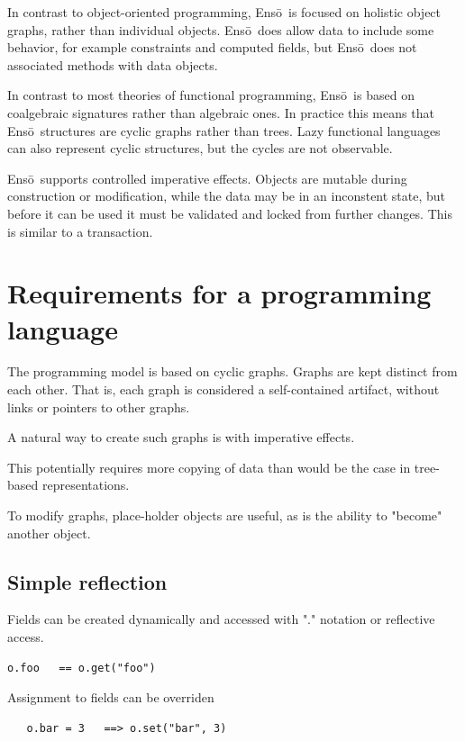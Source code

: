 \documentclass[11pt]{article}
\newcommand{\Enso}{Ens\={o}}
\begin{document}
In contrast to
object-oriented programming, \Enso\ is focused on holistic
object graphs, rather than individual objects. \Enso\ 
does allow data to include some behavior, for example constraints
and computed fields, but \Enso\ does not associated methods
with data objects.

In contrast to
most theories of functional programming, \Enso\ is based on
coalgebraic signatures rather than algebraic ones. In practice
this means that \Enso\ structures are cyclic graphs rather than
trees. Lazy functional languages can also represent cyclic 
structures, but the cycles are not observable.

\Enso\ supports controlled imperative effects. Objects are
mutable during construction or modification, while the data may be in an
inconstent state, but before it can be used it must be validated
and locked from further changes. This is similar to a transaction.



\section{Requirements for a programming language}

The programming model is based on cyclic graphs.
Graphs are kept distinct from each other. That is,
each graph is considered a self-contained
artifact, without links or pointers to other graphs.

A natural way to create such graphs is with 
imperative effects.

This potentially requires more copying of data
than would be the case in tree-based representations.

To modify graphs, place-holder objects are useful,
as is the ability to "become" another object.

\subsection{Simple reflection}

Fields can be created dynamically and accessed with
"." notation or reflective access.

\begin{verbatim}
o.foo   == o.get("foo")
\end{verbatim}

Assignment to fields can be overriden
\begin{verbatim}
   o.bar = 3   ==> o.set("bar", 3)
\end{verbatim}
\end{document}
